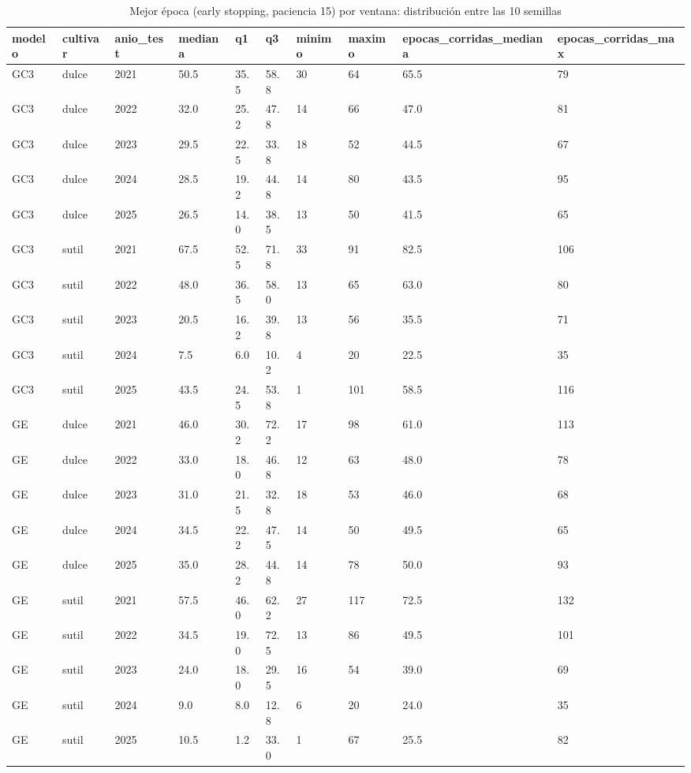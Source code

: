 \begin{table}[H]
\centering
\small
\caption{Mejor época (early stopping, paciencia 15) por ventana: distribución entre las 10 semillas}
\label{tab:T15_mejor_epoca_por_ventana}
\begin{tabular}{llllllllll}
\toprule
modelo & cultivar & anio\_test & mediana & q1 & q3 & minimo & maximo & epocas\_corridas\_mediana & epocas\_corridas\_max \\
\midrule
GC3 & dulce & 2021 & 50.5 & 35.5 & 58.8 & 30 & 64 & 65.5 & 79 \\
GC3 & dulce & 2022 & 32.0 & 25.2 & 47.8 & 14 & 66 & 47.0 & 81 \\
GC3 & dulce & 2023 & 29.5 & 22.5 & 33.8 & 18 & 52 & 44.5 & 67 \\
GC3 & dulce & 2024 & 28.5 & 19.2 & 44.8 & 14 & 80 & 43.5 & 95 \\
GC3 & dulce & 2025 & 26.5 & 14.0 & 38.5 & 13 & 50 & 41.5 & 65 \\
GC3 & sutil & 2021 & 67.5 & 52.5 & 71.8 & 33 & 91 & 82.5 & 106 \\
GC3 & sutil & 2022 & 48.0 & 36.5 & 58.0 & 13 & 65 & 63.0 & 80 \\
GC3 & sutil & 2023 & 20.5 & 16.2 & 39.8 & 13 & 56 & 35.5 & 71 \\
GC3 & sutil & 2024 & 7.5 & 6.0 & 10.2 & 4 & 20 & 22.5 & 35 \\
GC3 & sutil & 2025 & 43.5 & 24.5 & 53.8 & 1 & 101 & 58.5 & 116 \\
GE & dulce & 2021 & 46.0 & 30.2 & 72.2 & 17 & 98 & 61.0 & 113 \\
GE & dulce & 2022 & 33.0 & 18.0 & 46.8 & 12 & 63 & 48.0 & 78 \\
GE & dulce & 2023 & 31.0 & 21.5 & 32.8 & 18 & 53 & 46.0 & 68 \\
GE & dulce & 2024 & 34.5 & 22.2 & 47.5 & 14 & 50 & 49.5 & 65 \\
GE & dulce & 2025 & 35.0 & 28.2 & 44.8 & 14 & 78 & 50.0 & 93 \\
GE & sutil & 2021 & 57.5 & 46.0 & 62.2 & 27 & 117 & 72.5 & 132 \\
GE & sutil & 2022 & 34.5 & 19.0 & 72.5 & 13 & 86 & 49.5 & 101 \\
GE & sutil & 2023 & 24.0 & 18.0 & 29.5 & 16 & 54 & 39.0 & 69 \\
GE & sutil & 2024 & 9.0 & 8.0 & 12.8 & 6 & 20 & 24.0 & 35 \\
GE & sutil & 2025 & 10.5 & 1.2 & 33.0 & 1 & 67 & 25.5 & 82 \\
\bottomrule
\end{tabular}
\end{table}